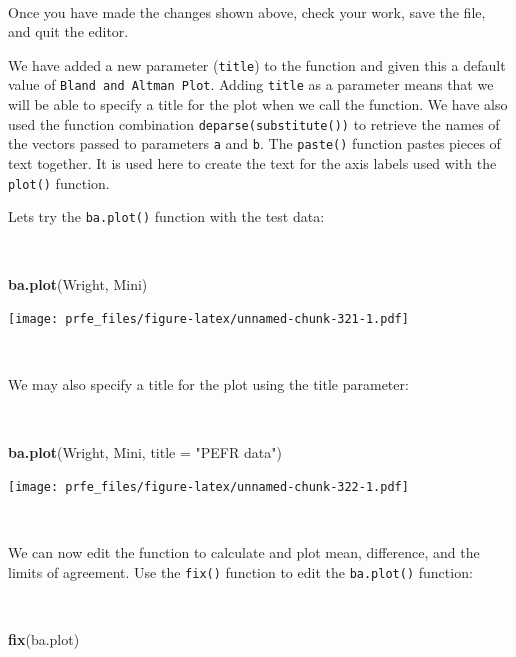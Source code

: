 \documentclass[12pt,a4paper]{book}
\newenvironment{Shaded}{\begin{snugshade}}{\end{snugshade}}
\newcommand{\DataTypeTok}[1]{\textcolor[rgb]{0.13,0.29,0.53}{#1}}
\newcommand{\KeywordTok}[1]{\textcolor[rgb]{0.13,0.29,0.53}{\textbf{#1}}}
\newcommand{\NormalTok}[1]{#1}
\newcommand{\StringTok}[1]{\textcolor[rgb]{0.31,0.60,0.02}{#1}}
\theoremstyle{definition}
\theoremstyle{definition}
\theoremstyle{definition}
\theoremstyle{remark}
\begin{document}
~

Once you have made the changes shown above, check your work, save the
file, and quit the editor.

We have added a new parameter (\texttt{title}) to the function and given
this a default value of \texttt{Bland\ and\ Altman\ Plot}. Adding
\texttt{title} as a parameter means that we will be able to specify a
title for the plot when we call the function. We have also used the
function combination \texttt{deparse(substitute())} to retrieve the
names of the vectors passed to parameters \texttt{a} and \texttt{b}. The
\texttt{paste()} function pastes pieces of text together. It is used
here to create the text for the axis labels used with the
\texttt{plot()} function.

Lets try the \texttt{ba.plot()} function with the test data:

~

\begin{Shaded}
\begin{Highlighting}[]
\KeywordTok{ba.plot}\NormalTok{(Wright, Mini)}
\end{Highlighting}
\end{Shaded}

\texttt{[image: prfe\_files/figure-latex/unnamed-chunk-321-1.pdf]}

~

We may also specify a title for the plot using the title parameter:

~

\begin{Shaded}
\begin{Highlighting}[]
\KeywordTok{ba.plot}\NormalTok{(Wright, Mini, }\DataTypeTok{title =} \StringTok{"PEFR data"}\NormalTok{)}
\end{Highlighting}
\end{Shaded}

\texttt{[image: prfe\_files/figure-latex/unnamed-chunk-322-1.pdf]}

~

We can now edit the function to calculate and plot mean, difference, and
the limits of agreement. Use the \texttt{fix()} function to edit the
\texttt{ba.plot()} function:

~

\begin{Shaded}
\begin{Highlighting}[]
\KeywordTok{fix}\NormalTok{(ba.plot)}
\end{Highlighting}
\end{Shaded}
\end{document}
